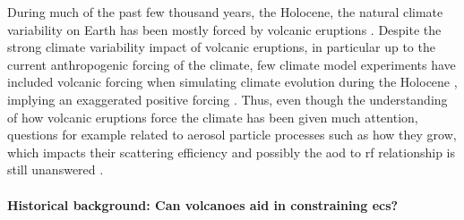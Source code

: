 \documentclass{ametsocV5}
\begin{document}
During much of the past few thousand years, the Holocene, the natural climate
variability on Earth has been mostly forced by volcanic eruptions \citep{sigl2022}.
Despite the strong climate variability impact of volcanic eruptions, in particular up to
the current anthropogenic forcing of the climate, few climate model experiments have
included volcanic forcing when simulating climate evolution during the Holocene
\citep{sigl2022}, implying an exaggerated positive forcing \citep{gregory2016}. Thus,
even though the understanding of how volcanic eruptions force the climate has been given
much attention, questions for example related to aerosol particle processes such as how
they grow, which impacts their scattering efficiency and possibly the \ac{aod} to
\ac{rf} relationship is still unanswered
\citep[e.g.][]{robock2000,zanchettin2019,marshall2020,marshall2022}.


\paragraph*{Historical background: Can volcanoes aid  in constraining \ac{ecs}?}

\end{document}
